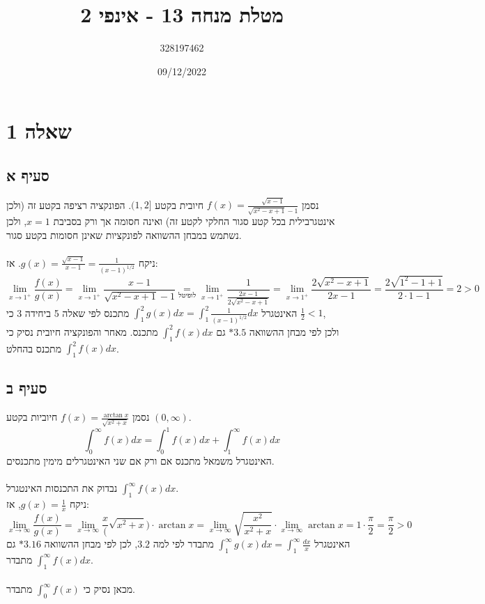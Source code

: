 \documentclass{article}
\title{מטלת מנחה 13 - אינפי 2}
\author{328197462}
\date{09/12/2022}
\newcommand\underrel[2]{\mathrel{\mathop{#2}\limits_{#1}}}
\begin{document}
\maketitle

\section*{שאלה 1}

\subsection*{סעיף א}

נסמן $f(x)=\frac{\sqrt{x-1}}{\sqrt{x^2-x+1}-1}$ חיובית בקטע $(1,2]$.
הפונקציה רציפה בקטע זה (ולכן אינטגרבילית בכל קטע סגור החלקי לקטע זה) ואינה חסומה אך ורק בסביבת $x=1$,
ולכן נשתמש במבחן ההשוואה לפונקציות שאינן חסומות בקטע סגור.\\\\
ניקח $g(x)=\frac{\sqrt{x-1}}{x-1}=\frac{1}{(x-1)^{1/2}}$. אז:
\[
    \lim_{x\rightarrow 1^+}\frac{f(x)}{g(x)} =
    \lim_{x\rightarrow 1^+}\frac{x-1}{\sqrt{x^2-x+1}-1} \underrel{\text{לופיטל}}{=}
    \lim_{x\rightarrow 1^+}\frac{1}{\frac{2x-1}{2\sqrt{x^2-x+1}}} =
    \lim_{x\rightarrow 1^+}\frac{2\sqrt{x^2-x+1}}{2x-1} =
    \frac{2\sqrt{1^2-1+1}}{2\cdot 1-1} = 2 > 0
\]
האינטגרל $\int_1^2 g(x)dx = \int_1^2 \frac{1}{(x-1)^{1/2}}dx$
מתכנס לפי שאלה 5 ביחידה 3 כי $\frac{1}{2}<1$, \\
ולכן לפי מבחן ההשוואה $*3.5$
גם $\int_1^2f(x)dx$ מתכנס.
מאחר והפונקציה חיובית נסיק כי $\int_1^2f(x)dx$ מתכנס בהחלט.

\subsection*{סעיף ב}

נסמן $f(x)=\frac{\arctan x}{\sqrt{x^2+x}}$ חיוביות בקטע $(0,\infty)$.
\[
    \int_0^\infty f(x)dx =
    \int_0^1 f(x)dx + \int_1^\infty f(x)dx
\]
האינטגרל משמאל מתכנס אם ורק אם שני האינטגרלים מימין מתכנסים.
\\\\
נבדוק את התכנסות האינטגרל $\int_1^{\infty}f(x)dx$. \\
ניקח $g(x)=\frac{1}{x}$, אז:
\[
    \lim_{x\rightarrow\infty}\frac{f(x)}{g(x)} =
    \lim_{x\rightarrow\infty} \frac{x}(\sqrt{x^2+x}) \cdot \arctan x =
    \lim_{x\rightarrow\infty} \sqrt{\frac{x^2}{x^2+x}} \cdot \lim_{x\rightarrow\infty} \arctan x =
    1 \cdot \frac{\pi}{2} = \frac{\pi}{2} > 0
\]
האינטגרל $\int_1^\infty g(x)dx=\int_1^\infty \frac{dx}{x}$
מתבדר לפי למה $3.2$, לכן לפי מבחן ההשוואה $*3.16$
גם $\int_1^\infty f(x)dx$ מתבדר.
\\\\
מכאן נסיק כי $\int_0^\infty f(x)$ מתבדר.
\end{document}
